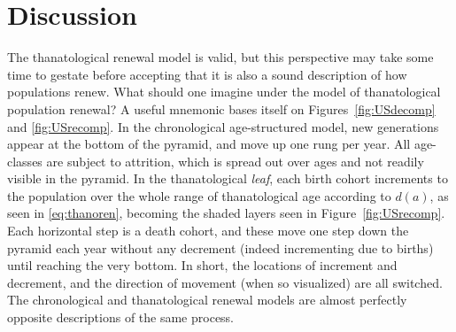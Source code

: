 \documentclass{article}
\begin{document}

\section*{Discussion}
The thanatological renewal model is valid, but this perspective may take some
time to gestate before accepting that it is also a sound description of how
populations renew. What should one imagine under the model of thanatological
population renewal? A useful mnemonic bases itself on Figures~\ref{fig:USdecomp}
and \ref{fig:USrecomp}. In the chronological age-structured model, new
generations appear at the bottom of the pyramid, and move up one rung per year.
All age-classes are subject to attrition, which is spread out over ages and not
readily visible in the pyramid. In the thanatological \textit{leaf}, each birth cohort increments to the population over the whole range of thanatological age
according to $d(a)$, as seen in \eqref{eq:thanoren}, becoming the
shaded layers seen in Figure~\ref{fig:USrecomp}. Each horizontal step is a death
cohort, and these move one step down the pyramid each year without any decrement
(indeed incrementing due to births) until reaching the very bottom. In short,
the locations of increment and decrement, and the direction of movement (when
so visualized) are all switched. The chronological and thanatological renewal
models are almost perfectly opposite descriptions of the same process. 
\end{document}
